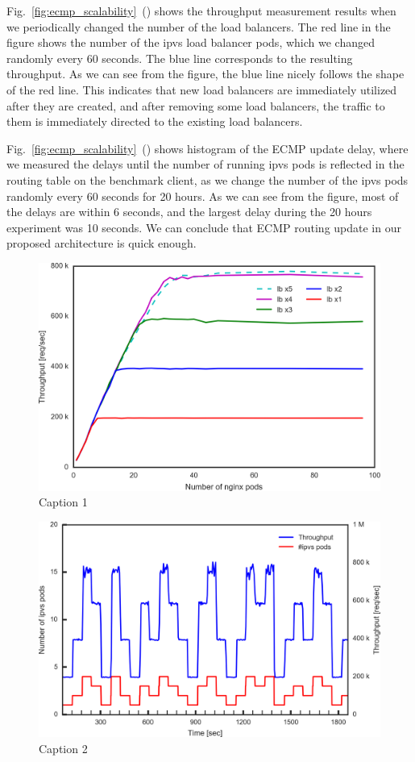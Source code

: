 Fig.~\ref{fig:ecmp_scalability}~() shows the throughput measurement results when we periodically changed the number of the load balancers. 
The red line in the figure shows the number of the ipvs load balancer pods, which we changed randomly every 60 seconds.
The blue line corresponds to the resulting throughput.
As we can see from the figure, the blue line nicely follows the shape of the red line.
This indicates that new load balancers are immediately utilized after they are created, and after removing some load balancers, the traffic to them is immediately directed to the existing load balancers.

Fig.~\ref{fig:ecmp_scalability}~() shows histogram of the ECMP update delay, where we measured the delays until the number of running ipvs pods is reflected in the routing table on the benchmark client, as we change the number of the ipvs pods randomly every 60 seconds for 20 hours.
As we can see from the figure, most of the delays are within 6 seconds, and the largest delay during the 20 hours experiment was 10 seconds.
We can conclude that ECMP routing update in our proposed architecture is quick enough.


\begin{figure}[t]
  \includegraphics[width=0.9\columnwidth,left]{Figs/ecmp_lb_cubic_ieice}
  \caption{Caption 1}
  \label{fig:ecmp_lb_cubic_ieice}
\end{figure}

\begin{figure}[t]
  \includegraphics[width=0.98\columnwidth,left]{Figs/ecmp_response_ieice}
  \caption{Caption 2}
  \label{fig:ecmp_response_ieice}
\end{figure}

